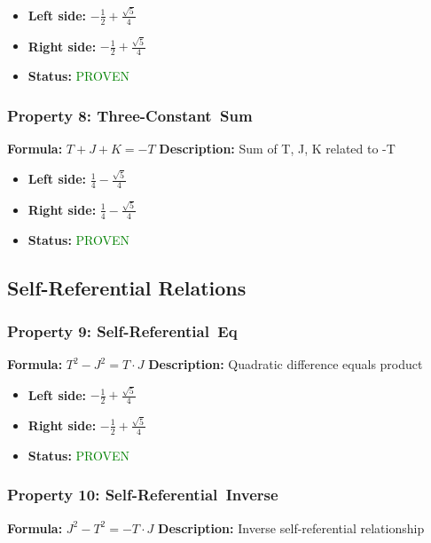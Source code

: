 \begin{itemize}
\item \textbf{Left side:} $- \frac{1}{2} + \frac{\sqrt{5}}{4}$
\item \textbf{Right side:} $- \frac{1}{2} + \frac{\sqrt{5}}{4}$
\item \textbf{Status:} \textcolor{green}{PROVEN}
\end{itemize}

\subsubsection*{Property 8: Three-Constant~Sum}
\textbf{Formula:} $T + J + K = -T$
\textbf{Description:} Sum of T, J, K related to -T

\begin{itemize}
\item \textbf{Left side:} $\frac{1}{4} - \frac{\sqrt{5}}{4}$
\item \textbf{Right side:} $\frac{1}{4} - \frac{\sqrt{5}}{4}$
\item \textbf{Status:} \textcolor{green}{PROVEN}
\end{itemize}


\subsection{Self-Referential Relations}

\subsubsection*{Property 9: Self-Referential~Eq}
\textbf{Formula:} $T^2 - J^2 = T \cdot J$
\textbf{Description:} Quadratic difference equals product

\begin{itemize}
\item \textbf{Left side:} $- \frac{1}{2} + \frac{\sqrt{5}}{4}$
\item \textbf{Right side:} $- \frac{1}{2} + \frac{\sqrt{5}}{4}$
\item \textbf{Status:} \textcolor{green}{PROVEN}
\end{itemize}

\subsubsection*{Property 10: Self-Referential~Inverse}
\textbf{Formula:} $J^2 - T^2 = -T \cdot J$
\textbf{Description:} Inverse self-referential relationship

